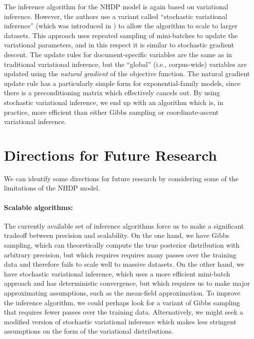 \documentclass{article}
\begin{document}
The inference algorithm for the NHDP model is again based on variational inference.
However, the authors use a variant called ``stochastic variational inference'' (which was introduced in \cite{hoffman2013stochastic}) to allow the algorithm to scale to larger datasets.
This approach uses repeated sampling of mini-batches to update the variational parameters, and in this respect it is similar to stochastic gradient descent.
The update rules for document-specific variables are the same as in traditional variational inference, but the ``global'' (i.e., corpus-wide) variables are updated using the \emph{natural gradient} of the objective function.
The natural gradient update rule has a particularly simple form for exponential-family models, since there is a preconditioning matrix which effectively cancels out.
By using stochastic variational inference, we end up with an algorithm which is, in practice, more efficient than either Gibbs sampling or coordinate-ascent variational inference.


\section{Directions for Future Research}

We can identify some directions for future research by considering some of the limitations of the NHDP model.

\paragraph{Scalable algorithms:}
The currently available set of inference algorithms force us to make a significant tradeoff between precision and scalability.
On the one hand, we have Gibbs sampling, which can theoretically compute the true posterior distribution with arbitrary precision, but which requires requires many passes over the training data and therefore fails to scale well to massive datasets.
On the other hand, we have stochastic variational inference, which uses a more efficient mini-batch approach and has deterministic convergence, but which requires us to make major approximating assumptions, such as the mean-field approximation.
To improve the inference algorithm, we could perhaps look for a variant of Gibbs sampling that requires fewer passes over the training data.
Alternatively, we might seek a modified version of stochastic variational inference which makes less stringent assumptions on the form of the variational distributions.
\end{document}
